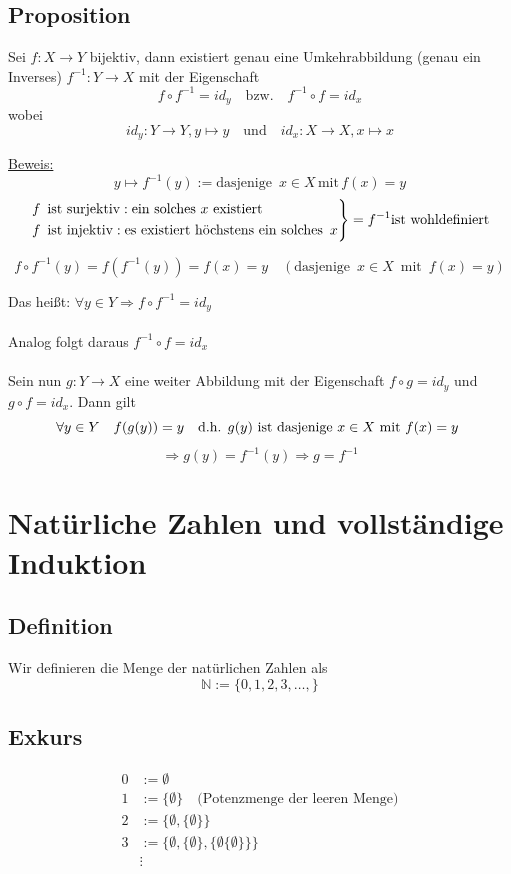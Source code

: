 \subsection{Proposition}
Sei \( f : X \rightarrow Y \) bijektiv, dann existiert genau eine Umkehrabbildung (genau ein Inverses) \( f^{-1} : Y \rightarrow X \) mit der Eigenschaft 
\[  f \circ f^{-1} = id_y  \quad  \text{bzw.} \quad f^{-1} \circ f = id_x \]
wobei 
\[  id_y : Y \rightarrow Y , y \mapsto y \quad  \text{und} \quad id_x : X \rightarrow X, x \mapsto x\]

\underline{Beweis:} \[ y \mapsto f^{-1}(y) := \text{dasjenige} \enspace x \in X \, \text{mit} \, f(x)=y \]
\[ 
\begin{rcases} 
f \enspace \text{ist surjektiv} : \text{ein solches \( x \) existiert} \\ 
f \enspace \text{ist injektiv} : \text{es existiert höchstens ein solches} \enspace x 
\end{rcases}
= f^{-1} \text{ist wohldefiniert}
\]

\[
f \circ f^{-1}(y) = f(f^{-1}(y)) = f(x) = y \quad (\text{dasjenige} \enspace x \in X \enspace \text{mit} \enspace f(x)=y)
\]

Das heißt: \( \forall y \in Y \Rightarrow f \circ f^{-1}=id_y \) \\
\\
Analog folgt daraus \( f^{-1} \circ f = id_x\)
\\
\\
Sein nun \( g: Y \rightarrow X \) eine weiter Abbildung mit der Eigenschaft \( f \circ g = id_y \) und \( g \circ f = id_x \). Dann gilt 
\[
\forall y \in Y \quad f(g(y))=y \quad \text{d.h. \( g(y) \) ist dasjenige \( x \in X \) mit \( f(x)=y \) }
\]
\[
\Longrightarrow g(y)=f^{-1}(y) \Rightarrow g=f^{-1}
\]
\newpage

\section{Natürliche Zahlen und vollständige Induktion}
\subsection{Definition}
Wir definieren die Menge der natürlichen Zahlen als \[ \mathbb{N} := \{ 0, 1, 2, 3, \ldots, \} \]
\subsection{Exkurs}
\begin{align*}
0 &:= \emptyset \\
1 &:= \{ \emptyset \} \quad \text{(Potenzmenge der leeren Menge)} \\
2 &:= \{ \emptyset, \{ \emptyset \} \} \\
3 &:= \{ \emptyset, \{ \emptyset \}, \{ \emptyset \{ \emptyset \} \} \} \\
&\vdots
\end{align*}
